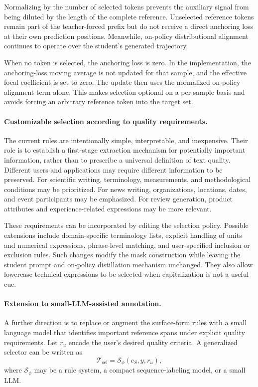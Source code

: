 \documentclass{article} %
\begin{document}
Normalizing by the number of selected tokens prevents the auxiliary signal from being diluted by the length of the complete reference. Unselected reference tokens remain part of the teacher-forced prefix but do not receive a direct anchoring loss at their own prediction positions. Meanwhile, on-policy distributional alignment continues to operate over the student's generated trajectory.

When no token is selected, the anchoring loss is zero. In the implementation, the anchoring-loss moving average is not updated for that sample, and the effective focal coefficient is set to zero. The update then uses the normalized on-policy alignment term alone. This makes selection optional on a per-sample basis and avoids forcing an arbitrary reference token into the target set.

\paragraph{Customizable selection according to quality requirements.}
The current rules are intentionally simple, interpretable, and inexpensive. Their role is to establish a first-stage extraction mechanism for potentially important information, rather than to prescribe a universal definition of text quality. Different users and applications may require different information to be preserved. For scientific writing, terminology, measurements, and methodological conditions may be prioritized. For news writing, organizations, locations, dates, and event participants may be emphasized. For review generation, product attributes and experience-related expressions may be more relevant.

These requirements can be incorporated by editing the selection policy. Possible extensions include domain-specific terminology lists, explicit handling of units and numerical expressions, phrase-level matching, and user-specified inclusion or exclusion rules. Such changes modify the mask construction while leaving the student prompt and on-policy distillation mechanism unchanged. They also allow lowercase technical expressions to be selected when capitalization is not a useful cue.

\paragraph{Extension to small-LLM-assisted annotation.}
A further direction is to replace or augment the surface-form rules with a small language model that identifies important reference spans under explicit quality requirements. Let $r_u$ encode the user's desired quality criteria. A generalized selector can be written as
\begin{equation}
\mathcal{T}_{\mathrm{sel}}
=
\mathcal{S}_{\phi}(c_S,y,r_u),
\end{equation}
where $\mathcal{S}_{\phi}$ may be a rule system, a compact sequence-labeling model, or a small LLM.
\end{document}
